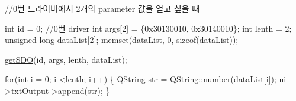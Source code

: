 \begin{DoxyCode}
\textcolor{comment}{//0번 드라이버에서 2개의 parameter 값을 얻고 싶을 때}

\textcolor{keywordtype}{int} \textcolor{keywordtype}{id} = 0;                                  \textcolor{comment}{//0번 driver}
\textcolor{keywordtype}{int} args[2] = \{0x30130010, 0x30140010\};
\textcolor{keywordtype}{int} lenth = 2;
\textcolor{keywordtype}{unsigned} \textcolor{keywordtype}{long} dataList[2];
memset(dataList, 0, \textcolor{keyword}{sizeof}(dataList));

\hyperlink{classCUIApp_a339bd304f36c7eafa52efd7d06742b33}{getSDO}(\textcolor{keywordtype}{id}, args, lenth, dataList);

\textcolor{keywordflow}{for}(\textcolor{keywordtype}{int} i = 0; i <lenth; i++)
\{
    QString str = QString::number(dataList[i]);
    ui->txtOutput->append(str);
\}
\end{DoxyCode}
 

